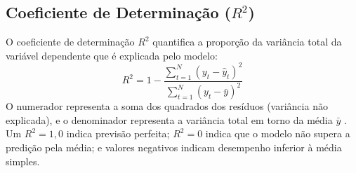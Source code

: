\subsection{Coeficiente de Determinação \texorpdfstring{($R^2$)}{(R2)}}
O coeficiente de determinação $R^2$ quantifica a proporção da variância total da variável dependente que é explicada pelo modelo:
\begin{equation}
    R^2 = 1 - \frac{\sum_{t=1}^N (y_t - \hat{y}_t)^2}{\sum_{t=1}^N (y_t - \bar{y})^2}
\end{equation}
O numerador representa a soma dos quadrados dos resíduos (variância não explicada), e o denominador representa a variância total em torno da média $\bar{y}$ \cite{box2015time}. Um $R^2 = 1{,}0$ indica previsão perfeita; $R^2 = 0$ indica que o modelo não supera a predição pela média; e valores negativos indicam desempenho inferior à média simples.


